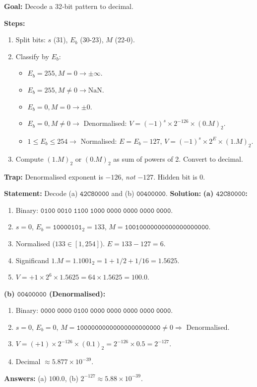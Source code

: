 \documentclass[11pt]{article}
\begin{document}
\begin{methode}
\textbf{Goal:} Decode a 32‑bit pattern to decimal.\par
\textbf{Steps:}
\begin{enumerate}
    \item Split bits: $s$ (31), $E_b$ (30-23), $M$ (22-0).
    \item Classify by $E_b$:
          \begin{itemize}
              \item $E_b = 255, M=0 \to \pm\infty$.
              \item $E_b = 255, M\neq0 \to \text{NaN}$.
              \item $E_b = 0, M=0 \to \pm 0$.
              \item $E_b = 0, M\neq0 \to$ Denormalised: $V = (-1)^s \times 2^{-126} \times (0.M)_2$.
              \item $1 \le E_b \le 254 \to$ Normalised: $E = E_b - 127$, $V = (-1)^s \times 2^E \times (1.M)_2$.
          \end{itemize}
    \item Compute $(1.M)_2$ or $(0.M)_2$ as sum of powers of 2. Convert to decimal.
\end{enumerate}
\textbf{Trap:} Denormalised exponent is $-126$, \emph{not} $-127$. Hidden bit is $0$.
\end{methode}

\begin{exoresolu}
\textbf{Statement:} Decode (a) $\mathtt{42C80000}$ and (b) $\mathtt{00400000}$.
\tcblower
\textbf{Solution:}
\textbf{(a) $\mathtt{42C80000}$:}
\begin{enumerate}
    \item Binary: $\mathtt{0100\;0010\;1100\;1000\;0000\;0000\;0000\;0000}$.
    \item $s=0$, $E_b=\mathtt{10000101}_2=133$, $M=\mathtt{10010000000000000000000}$.
    \item Normalised ($133 \in [1,254]$). $E = 133-127 = 6$.
    \item Significand $1.M = 1.1001_2 = 1 + 1/2 + 1/16 = 1.5625$.
    \item $V = +1 \times 2^6 \times 1.5625 = 64 \times 1.5625 = 100.0$.
\end{enumerate}
\textbf{(b) $\mathtt{00400000}$ (Denormalised):}
\begin{enumerate}
    \item Binary: $\mathtt{0000\;0000\;0100\;0000\;0000\;0000\;0000\;0000}$.
    \item $s=0$, $E_b=0$, $M=\mathtt{10000000000000000000000} \neq 0 \Rightarrow$ Denormalised.
    \item $V = (+1) \times 2^{-126} \times (0.1)_2 = 2^{-126} \times 0.5 = 2^{-127}$.
    \item Decimal $\approx 5.877 \times 10^{-39}$.
\end{enumerate}
\textbf{Answers:} (a) $100.0$, (b) $2^{-127} \approx 5.88 \times 10^{-39}$.
\end{exoresolu}
\end{document}
